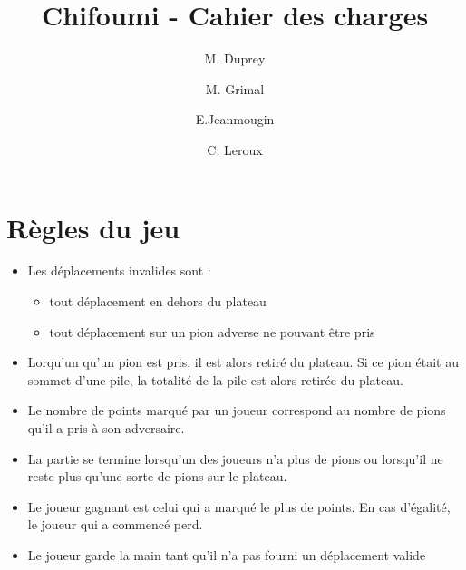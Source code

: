 \documentclass[12pt]{article}
\begin{document}
 
\title{Chifoumi - Cahier des charges}
\author{M. Duprey \and M. Grimal \and E.Jeanmougin \and C. Leroux}
 
 
 \maketitle
 
 \newpage
 \tableofcontents
\newpage

\section{Règles du jeu}

\begin{itemize}
 \item Les déplacements invalides sont :
\begin{itemize}
 \item[\textbullet] tout déplacement en dehors du plateau 
 \item[\textbullet] tout déplacement sur un pion adverse ne pouvant être pris
\end{itemize}
\item Lorqu'un qu'un pion est pris, il est alors retiré du plateau. Si ce pion était au sommet d'une pile, la totalité de la pile est alors retirée du plateau. 
\item Le nombre de points marqué par un joueur correspond au nombre de pions qu'il a pris à son adversaire.
\item La partie se termine lorsqu'un des joueurs n'a plus de pions ou lorsqu'il ne reste plus qu'une sorte de pions sur le plateau.
\item Le joueur gagnant est celui qui a marqué le plus de points. En cas d'égalité, le joueur qui a commencé perd.
\item Le joueur garde la main tant qu'il n'a pas fourni un déplacement valide
\end{itemize}
\end{document}
